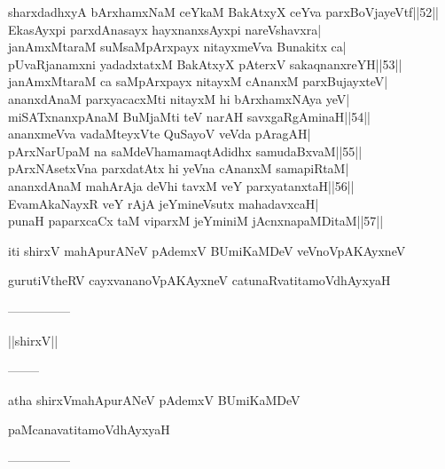 \documentclass{article}
\begin{document}
sharxdadhxyA bArxhamxNaM ceYkaM BakAtxyX ceYva parxBoVjayeVtf||52||\\
EkasAyxpi parxdAnasayx hayxnanxsAyxpi nareVshavxra|\\
janAmxMtaraM suMsaMpArxpayx nitayxmeVva Bunakitx ca|\\
pUvaRjanamxni yadadxtatxM BakAtxyX pAterxV sakaqnanxreYH||53||\\
janAmxMtaraM ca saMpArxpayx nitayxM cAnanxM parxBujayxteV|\\
ananxdAnaM parxyacacxMti nitayxM hi bArxhamxNAya yeV|\\
miSATxnanxpAnaM BuMjaMti teV narAH savxgaRgAminaH||54||\\
ananxmeVva vadaMteyxVte QuSayoV veVda pAragAH|\\
pArxNarUpaM na saMdeVhamamaqtAdidhx samudaBxvaM||55||\\
pArxNAsetxVna parxdatAtx hi yeVna cAnanxM samapiRtaM|\\
ananxdAnaM mahArAja deVhi tavxM veY parxyatanxtaH||56||\\
EvamAkaNayxR veY rAjA jeYmineVsutx mahadavxcaH|\\
punaH paparxcaCx taM viparxM jeYminiM jAcnxnapaMDitaM||57||

\begin{center}
iti shirxV mahApurANeV pAdemxV BUmiKaMDeV veVnoVpAKAyxneV
\end{center}

\begin{center}
gurutiVtheRV cayxvananoVpAKAyxneV catunaRvatitamoVdhAyxyaH
\end{center}

\begin{center}
---------------
\end{center}

\begin{center}
||shirxV||
\end{center}

\begin{center}
--------
\end{center}

\begin{center}
atha shirxVmahApurANeV pAdemxV BUmiKaMDeV
\end{center}

\begin{center}
paMcanavatitamoVdhAyxyaH
\end{center}

\begin{center}
---------------
\end{center}
\end{document}
